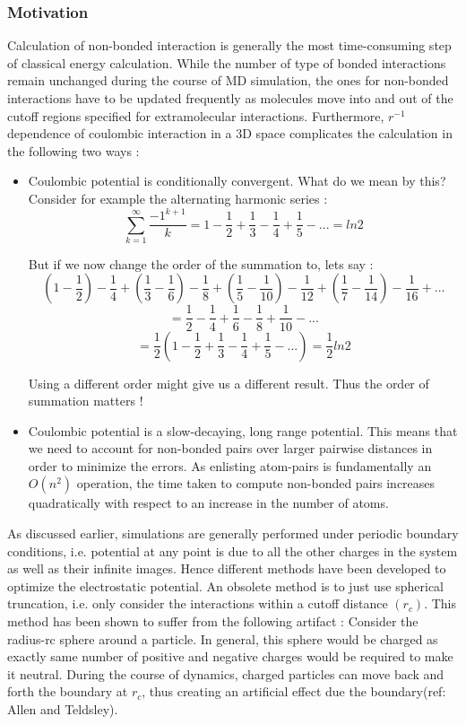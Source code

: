 \documentclass[9pt,bestpractices]{livecoms}
\begin{document}
\subsubsection{Motivation}

Calculation of non-bonded interaction is generally the most time-consuming step of classical energy calculation. While the number of type of bonded interactions remain unchanged during the course of MD simulation, the ones for non-bonded interactions have to be updated frequently as molecules move into and out of the cutoff regions specified for extramolecular interactions. Furthermore, $r^{-1} $ dependence  of coulombic interaction in a 3D space complicates the calculation in the following two ways :
\begin{itemize}
\item Coulombic potential is conditionally convergent. What do we mean by this? Consider for example the alternating harmonic series : \\
\[
\sum_{k=1}^{\infty} \frac{-1^{k+1}}{k} = 1 - \frac{1}{2} + \frac{1}{3} - \frac{1}{4} + \frac{1}{5} - ... = ln 2 
\]

But if we now change the order of the summation to, lets say :
\[
( 1 - \frac{1}{2})  - \frac{1}{4} + (\frac{1}{3} - \frac{1}{6}) - \frac{1}{8} + (\frac{1}{5} - \frac{1}{10}) - \frac{1}{12} + (\frac{1}{7} - \frac{1}{14}) - \frac{1}{16} + ...
\]
\[
= \frac{1}{2} - \frac{1}{4} + \frac{1}{6} - \frac{1}{8} + \frac{1}{10} - ...
\]
\[
= \frac{1}{2} (1 - \frac{1}{2} + \frac{1}{3} - \frac{1}{4} + \frac{1}{5} - ...) = \frac{1}{2} ln 2
\]

Using a different order might give us a different result. Thus the order of summation matters !

\item Coulombic potential is a slow-decaying, long range potential. This means that we need to account for non-bonded pairs over larger pairwise distances in order to minimize the errors. As enlisting atom-pairs is fundamentally an $O(n^2) $ operation, the time taken to compute non-bonded pairs increases quadratically with respect to an increase in the number of atoms.
\end{itemize}

As discussed earlier, simulations are generally performed under periodic boundary conditions, i.e. potential at any point is due to all the other charges in the system as well as their infinite images. Hence different methods have been developed to optimize the electrostatic potential. An obsolete method is to just use spherical truncation, i.e. only consider the interactions within a cutoff distance $(r_c)$. This method has been shown to suffer from the following artifact : Consider the radius-rc sphere around a particle. In general, this sphere would be charged as exactly same number of positive and negative charges would be required to make it neutral. During the course of dynamics, charged particles can move back and forth the boundary at $r_c$, thus creating an artificial effect due the boundary(ref: Allen and Teldsley).
\end{document}
